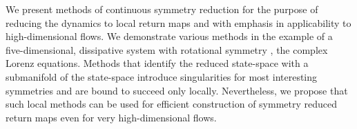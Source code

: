 We present methods of continuous symmetry reduction for the purpose of reducing the dynamics to local
return maps and with emphasis in applicability to high-dimensional flows. 
We demonstrate various methods in the example of a five-dimensional, dissipative system
with rotational symmetry , the complex Lorenz equations. Methods that identify 
the reduced state-space with a submanifold of the state-space introduce
singularities for most interesting symmetries and are bound to succeed only locally. 
Nevertheless, we propose that such local methods can be used for
efficient construction of symmetry reduced return maps even for very high-dimensional
flows.

